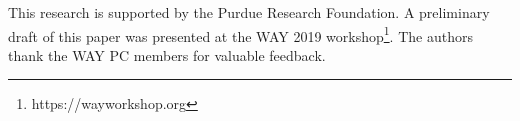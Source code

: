 















\begin{acks}
This research is supported by the Purdue Research Foundation. A preliminary draft of this paper was presented at the WAY 2019 workshop\footnote{https://wayworkshop.org}. The authors thank the WAY PC members for valuable feedback.
\end{acks}
